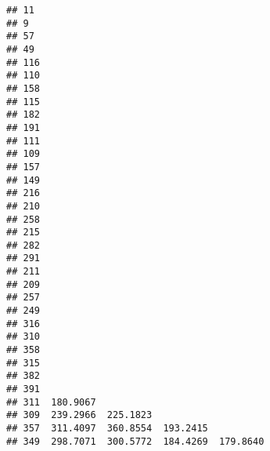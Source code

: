\documentclass[
]{article}
\begin{document}
\begin{verbatim}
## 11                                                                       
## 9                                                                        
## 57                                                                       
## 49                                                                       
## 116                                                                      
## 110                                                                      
## 158                                                                      
## 115                                                                      
## 182                                                                      
## 191                                                                      
## 111                                                                      
## 109                                                                      
## 157                                                                      
## 149                                                                      
## 216                                                                      
## 210                                                                      
## 258                                                                      
## 215                                                                      
## 282                                                                      
## 291                                                                      
## 211                                                                      
## 209                                                                      
## 257                                                                      
## 249                                                                      
## 316                                                                      
## 310                                                                      
## 358                                                                      
## 315                                                                      
## 382                                                                      
## 391                                                                      
## 311  180.9067                                                            
## 309  239.2966  225.1823                                                  
## 357  311.4097  360.8554  193.2415                                        
## 349  298.7071  300.5772  184.4269  179.8640                              

\end{verbatim}
\end{document}
